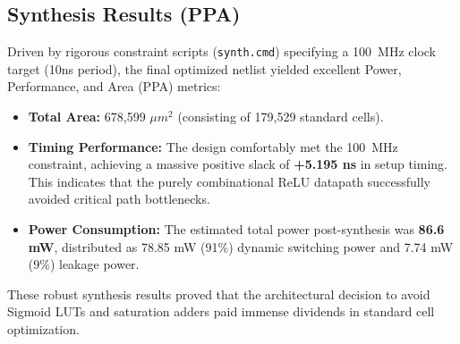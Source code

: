\subsection{Synthesis Results (PPA)}
Driven by rigorous constraint scripts (\texttt{synth.cmd}) specifying a 100~MHz clock target (10ns period), the final optimized netlist yielded excellent Power, Performance, and Area (PPA) metrics:
\begin{itemize}
    \item \textbf{Total Area:} 678,599 $\mu m^2$ (consisting of 179,529 standard cells).
    \item \textbf{Timing Performance:} The design comfortably met the 100~MHz constraint, achieving a massive positive slack of \textbf{+5.195 ns} in setup timing. This indicates that the purely combinational ReLU datapath successfully avoided critical path bottlenecks.
    \item \textbf{Power Consumption:} The estimated total power post-synthesis was \textbf{86.6 mW}, distributed as 78.85 mW (91\%) dynamic switching power and 7.74 mW (9\%) leakage power.
\end{itemize}
These robust synthesis results proved that the architectural decision to avoid Sigmoid LUTs and saturation adders paid immense dividends in standard cell optimization.
